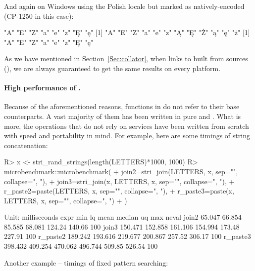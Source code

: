 \documentclass[nojss]{jss}\usepackage[]{graphicx}\usepackage[]{color}
\begin{document}
And again on Windows using the Polish locale
but  marked as natively-encoded (CP-1250 in this case):

\begin{Schunk}
\begin{Soutput}
[1] "A" "E" "Z" "a" "e" "z" "Ę" "ę"
[1] "A" "E" "Z" "a" "e" "z" "Ą" "Ę" "Ż" "ą" "ę" "ż"
[1] "A" "E" "Z" "a" "e" "z" "Ę" "ę"
\end{Soutput}
\end{Schunk}

As we have mentioned in Section~\ref{Sec:collator},
when  links to  built from sources
(),
we are always guaranteed to get the same results on every platform.




\paragraph{High performance of .}
Because of the aforementioned reasons, functions in 
do not refer to their  base  counterparts.
A vast majority of them has been written in pure
 and . What is more, the operations that do not rely on 
services
have been written from scratch with speed and portability in mind.
For example, here are some timings of string concatenation:


\begin{Schunk}
\begin{Sinput}
R> x <- stri_rand_strings(length(LETTERS)*1000, 1000)
R> microbenchmark::microbenchmark(
+    join2=stri_join(LETTERS, x, sep="", collapse=", "),
+    join3=stri_join(x, LETTERS, x, sep="", collapse=", "),
+    r_paste2=paste(LETTERS, x, sep="", collapse=", "),
+    r_paste3=paste(x, LETTERS, x, sep="", collapse=", ")
+  )
\end{Sinput}
\begin{Soutput}
Unit: milliseconds
     expr     min      lq    mean  median     uq    max neval
    join2  65.047  66.854  85.585  68.081 124.24 140.66   100
    join3 150.471 152.858 161.106 154.994 173.48 227.91   100
 r_paste2 189.242 193.616 219.677 200.867 257.52 306.17   100
 r_paste3 398.432 409.254 470.062 496.744 509.85 526.54   100
\end{Soutput}
\end{Schunk}

Another example -- timings of fixed pattern searching:
\end{document}
